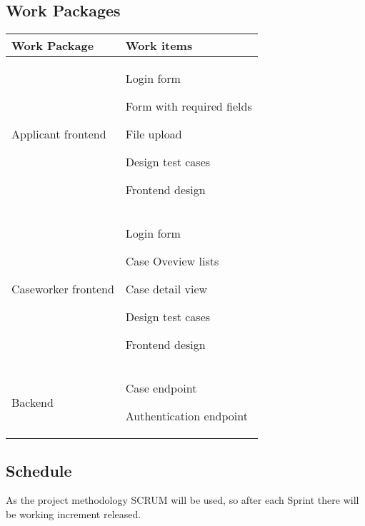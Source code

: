 \subsection{Work Packages}

\begin{table}[htb!]
    \begin{tabularx}{\textwidth}{l|X}
        \textbf{Work Package} & \textbf{Work items} \\
        \hline
        Applicant frontend & 
        \begin{compactitem}
            \item Login form
            \item Form with required fields
            \item File upload
            \item Design test cases
            \item Frontend design
        \end{compactitem}\\
        \hline
        Caseworker frontend & 
        \begin{compactitem}
            \item Login form
            \item Case Oveview lists
            \item Case detail view
            \item Design test cases
            \item Frontend design
        \end{compactitem}\\
        \hline
        Backend & 
        \begin{compactitem}
            \item Case endpoint
            \item Authentication endpoint
        \end{compactitem}\\
        \hline
    \end{tabularx}
\end{table}
\newpage
\subsection{Schedule}
As the project methodology SCRUM will be used, so after each Sprint there will be  working increment released.

